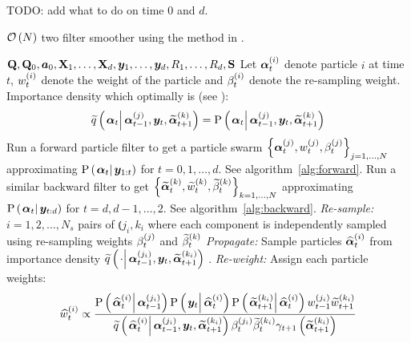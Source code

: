\newpage

TODO: add what to do on time 0 and $d$.

\begin{algorithm}
\caption{$\mathcal{O}\left( N\right)$ two filter smoother using the method in \cite{fearnhead10}.}\label{alg:ONsmoother}
\begin{algorithmic}[1]\raggedright
\INPUT
\Statex $\mathbf{Q},\mathbf{Q}_0,\bm{a}_0,\mathbf{X}_1,\dots,\mathbf{X}_d,\bm{y}_1,\dots,\bm{y}_d,R_1,\dots,R_d,\mathbf{S}$
%
\Statex Let $\bm{\alpha}_{t}^{\left( i\right)}$ denote particle $i$ at time $t$, $w_{t}^{\left( i\right)}$ denote the weight of the particle and $\beta_{t}^{\left( i\right)}$ denote the re-sampling weight.
%
\Statex Importance density which optimally is (see \citet[page 453]{fearnhead10}): 
\Statex \begin{equation}
	\IDAproxC{\vec{\alpha}_t}{\partic{\vec{\alpha}}{t-1}{j},\vec{y}_t, \particB{\vec{\alpha}}{t+1}{k}} = 
%
	\propC{\vec{\alpha}_t}{\partic{\vec{\alpha}}{t-1}{j},\vec{y}_t, \particB{\vec{\alpha}}{t+1}{k}}
\end{equation}
%
\State Run a forward particle filter to get a particle swarm %
	$\left\{ \bm{\alpha}_{t}^{\left( j\right)}, w_{t}^{\left( j\right)}, \beta_{t}^{\left( j\right)}\right\}_{j=1,\dots,N}$ %
	approximating $\propC{\vec{\alpha}_t}{\vec{y}_{1:t}}$ for $t = 0, 1, \dots, d$. See algorithm~\ref{alg:forward}.
\EndProcedure
%
\State Run a similar backward filter to get %
	$\left\{ \widetilde{\bm{\alpha}}_{t}^{\left( k\right)}, \widetilde{w}_{t}^{\left( k\right)}, \widetilde{\beta}_{t}^{\left( k\right)}\right\}_{k=1,\dots,N}$  %
	approximating $\propC{\vec{\alpha}_t}{\vec{y}_{t:d}}$ for $t = d, d-1, \dots , 2$. See algorithm~\ref{alg:backward}.
\EndProcedure
% 
\StateXX \emph{Re-sample:}
\State $i=1,2,\dots,N_s$ pairs of $\Lparen{j_i, k_i}$ where each component is independently sampled using re-sampling weights $\beta_{t}^{\left( j\right)}$ and $\widetilde{\beta}_{t}^{\left( k\right)}$
%
\StateXX \emph{Propagate:} 
\State Sample particles $\widehat{\bm{\alpha}}_{t}^{\left( i\right)}$ from importance density %
	$\IDAproxC{\cdot}{\partic{\vec{\alpha}}{t-1}{j_i},\vec{y}_t, \particB{\vec{\alpha}}{t + 1}{k_i}}$
.%
\StateXX \emph{Re-weight:}
\State Assign each particle weights:
\StateXX \begin{equation}\label{eqn:combineWeight}
 \particS{w}{t}{i} \propto \frac{
 	\propC{\particS{\vec{\alpha}}{t}{i}}{\partic{\vec{\alpha}}{t - 1}{j_i}}
 	\propC{\vec{y}_t}{\particS{\vec{\alpha}}{t}{i}}
 	\propC{\particB{\vec{\alpha}}{t + 1}{k_i}}{\particS{\vec{\alpha}}{t}{i}}
 	\partic{w}{t - 1}{j_i}\particB{w}{t + 1}{k_i}
 	}{ %
 	\IDAproxC{\particS{\vec{\alpha}}{t}{i}}{\partic{\vec{\alpha}}{t-1}{j_i},\vec{y}_t, \particB{\vec{\alpha}}{t+1}{k_i}}
 	\partic{\beta}{t}{j_i}\particB{\beta}{t}{k_i}\gamma_{t +1}\Lparen{\particB{\vec{\alpha}}{t+1}{k_i}}
 	} %
\end{equation}
\EndFor
\EndProcedure
\end{algorithmic}
\end{algorithm}



